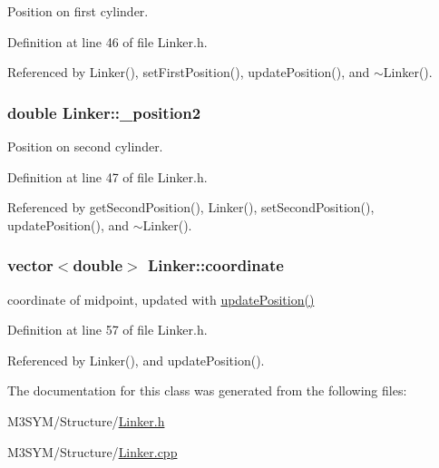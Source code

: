 Position on first cylinder. 



Definition at line 46 of file Linker.\+h.



Referenced by Linker(), set\+First\+Position(), update\+Position(), and $\sim$\+Linker().

\hypertarget{classLinker_a1efe8ae37a4b70b843c0d7f2dfa47b90}{
\subsubsection[{\+\_\+position2}]{\setlength{\rightskip}{0pt plus 5cm}double Linker\+::\+\_\+position2\hspace{0.3cm}{\ttfamily [private]}}}\label{classLinker_a1efe8ae37a4b70b843c0d7f2dfa47b90}


Position on second cylinder. 



Definition at line 47 of file Linker.\+h.



Referenced by get\+Second\+Position(), Linker(), set\+Second\+Position(), update\+Position(), and $\sim$\+Linker().

\hypertarget{classLinker_a224aa9b2a6f8f565aef4deae0fe299ce}{
\subsubsection[{coordinate}]{\setlength{\rightskip}{0pt plus 5cm}vector$<$double$>$ Linker\+::coordinate}}\label{classLinker_a224aa9b2a6f8f565aef4deae0fe299ce}


coordinate of midpoint, updated with \hyperlink{classLinker_aa268869b1ed75f38973aafd1362a5c42}{update\+Position()} 



Definition at line 57 of file Linker.\+h.



Referenced by Linker(), and update\+Position().



The documentation for this class was generated from the following files\+:\begin{DoxyCompactItemize}
\item 
M3\+S\+Y\+M/\+Structure/\hyperlink{Linker_8h}{Linker.\+h}\item 
M3\+S\+Y\+M/\+Structure/\hyperlink{Linker_8cpp}{Linker.\+cpp}\end{DoxyCompactItemize}

